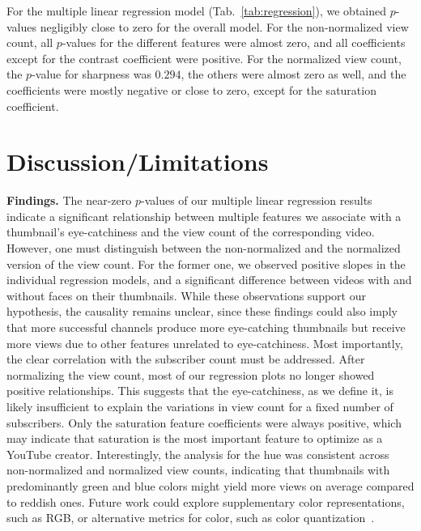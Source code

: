 \documentclass{article}
\begin{document}
For the multiple linear regression model (Tab.~\ref{tab:regression}), we obtained $p$-values negligibly close to zero for the overall model. For the non-normalized view count, all $p$-values for the different features were almost zero, and all coefficients except for the contrast coefficient were positive. For the normalized view count, the $p$-value for sharpness was $0.294$, the others were almost zero as well, and the coefficients were mostly negative or close to zero, except for the saturation coefficient.

\section{Discussion/Limitations}
\textbf{Findings.} The near-zero $p$-values of our multiple linear regression results indicate a significant relationship between multiple features we associate with a thumbnail's eye-catchiness and the view count of the corresponding video. However, one must distinguish between the non-normalized and the normalized version of the view count. For the former one, we observed positive slopes in the individual regression models, and a significant difference between videos with and without faces on their thumbnails. While these observations support our hypothesis, the causality remains unclear, since these findings could also imply that more successful channels produce more eye-catching thumbnails but receive more views due to other features unrelated to eye-catchiness. Most importantly, the clear correlation with the subscriber count must be addressed. After normalizing the view count, most of our regression plots no longer showed positive relationships. This suggests that the eye-catchiness, as we define it, is likely insufficient to explain the variations in view count for a fixed number of subscribers. Only the saturation feature coefficients were always positive, which may indicate that saturation is the most important feature to optimize as a YouTube creator. Interestingly, the analysis for the hue was consistent across non-normalized and normalized view counts, indicating that thumbnails with predominantly green and blue colors might yield more views on average compared to reddish ones. Future work could explore supplementary color representations, such as RGB, or alternative metrics for color, such as color quantization~\cite{colorquantization}.
\end{document}
